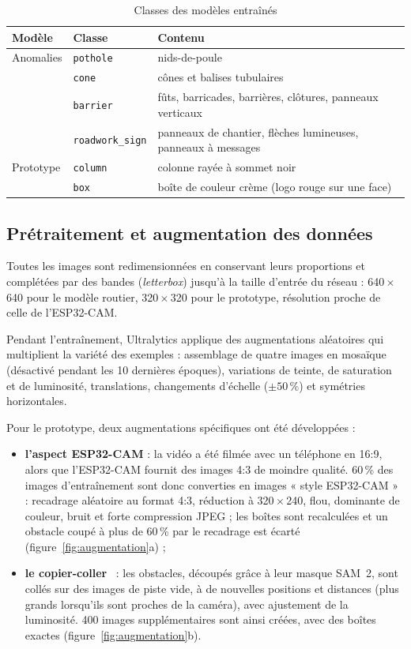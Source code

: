 \begin{table}[H]
\centering\small
\caption{Classes des modèles entraînés}
\label{tab:classes-hazards}
\begin{tabularx}{\linewidth}{l l X}
\toprule
\textbf{Modèle} & \textbf{Classe} & \textbf{Contenu} \\
\midrule
Anomalies & \texttt{pothole} & nids-de-poule \\
          & \texttt{cone} & cônes et balises tubulaires \\
          & \texttt{barrier} & fûts, barricades, barrières, clôtures, panneaux verticaux \\
          & \texttt{roadwork\_sign} & panneaux de chantier, flèches lumineuses, panneaux à messages \\
\midrule
Prototype & \texttt{column} & colonne rayée à sommet noir \\
          & \texttt{box} & boîte de couleur crème (logo rouge sur une face) \\
\bottomrule
\end{tabularx}
\end{table}

\subsection{Prétraitement et augmentation des données}
Toutes les images sont redimensionnées en conservant leurs proportions et complétées par des bandes
(\textit{letterbox}) jusqu'à la taille d'entrée du réseau : 640\,$\times$\,640 pour le modèle routier,
320\,$\times$\,320 pour le prototype, résolution proche de celle de l'ESP32-CAM.

Pendant l'entraînement, Ultralytics applique des augmentations aléatoires qui multiplient la variété des
exemples : assemblage de quatre images en mosaïque (désactivé pendant les 10 dernières époques), variations de
teinte, de saturation et de luminosité, translations, changements d'échelle ($\pm 50\,\%$) et symétries
horizontales.

Pour le prototype, deux augmentations spécifiques ont été développées :
\begin{itemize}
  \item \textbf{l'aspect ESP32-CAM} : la vidéo a été filmée avec un téléphone en 16:9, alors que l'ESP32-CAM
        fournit des images 4:3 de moindre qualité. 60\,\% des images d'entraînement sont donc converties en images
        « style ESP32-CAM » : recadrage aléatoire au format 4:3, réduction à 320\,$\times$\,240, flou, dominante de
        couleur, bruit et forte compression JPEG ; les boîtes sont recalculées et un obstacle coupé à plus de 60\,\%
        par le recadrage est écarté (figure~\ref{fig:augmentation}a) ;
  \item \textbf{le copier-coller}~\cite{ghiasi2021copypaste} : les obstacles, découpés grâce à leur masque SAM~2, sont
        collés sur des images de piste vide, à de nouvelles positions et distances (plus grands lorsqu'ils sont
        proches de la caméra), avec ajustement de la luminosité. 400 images supplémentaires sont ainsi créées, avec des
        boîtes exactes (figure~\ref{fig:augmentation}b).
\end{itemize}

